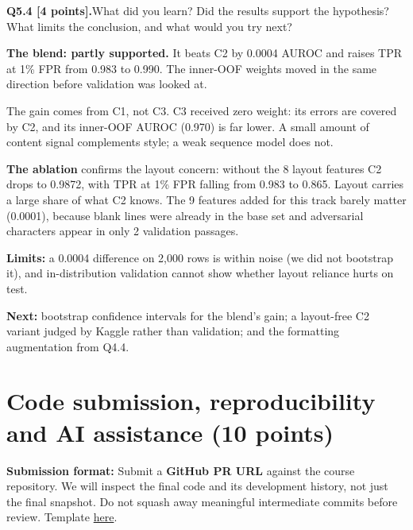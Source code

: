 \documentclass[11pt,letterpaper]{article}
\newcommand{\question}[2]{\needspace{4\baselineskip}\par\addvspace{0.45em}\noindent\textbf{#1}\quad #2\par\nobreak\vspace{0.1em}}
\begin{document}
\question{Q5.4 [4 points].}{What did you learn? Did the results support the hypothesis? What limits the conclusion, and what would you try next?}
\textbf{The blend: partly supported.} It beats C2 by 0.0004 AUROC and raises TPR at 1\% FPR from 0.983 to 0.990. The inner-OOF weights moved in the same direction before validation was looked at.

The gain comes from C1, not C3. C3 received zero weight: its errors are covered by C2, and its inner-OOF AUROC (0.970) is far lower. A small amount of content signal complements style; a weak sequence model does not.

\textbf{The ablation} confirms the layout concern: without the 8 layout features C2 drops to 0.9872, with TPR at 1\% FPR falling from 0.983 to 0.865. Layout carries a large share of what C2 knows. The 9 features added for this track barely matter (0.0001), because blank lines were already in the base set and adversarial characters appear in only 2 validation passages.

\textbf{Limits:} a 0.0004 difference on 2,000 rows is within noise (we did not bootstrap it), and in-distribution validation cannot show whether layout reliance hurts on test.

\textbf{Next:} bootstrap confidence intervals for the blend's gain; a layout-free C2 variant judged by Kaggle rather than validation; and the formatting augmentation from Q4.4.

\section{Code submission, reproducibility and AI assistance (10 points)}
\textbf{Submission format:} Submit a \textbf{GitHub PR URL} against the course repository. We will inspect the final code and its development history, not just the final snapshot. Do not squash away meaningful intermediate commits before review. Template \href{https://github.com/sekhari/human-or-ai-submissions}{here}.
\end{document}
